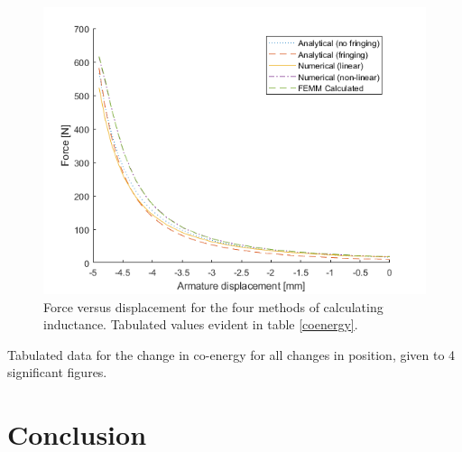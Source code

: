\documentclass[a4paper]{IEEEtran}
\begin{document}
    \begin{figure}[ht]
        \includegraphics[width = \linewidth]{F-x.png}
        \caption{Force versus displacement for the four methods of calculating inductance. Tabulated values evident in table \ref{coenergy}.}
        \label{forceGraph} 
    \end{figure}

    \begin{table}[ht]
        \centering
        
        \caption{Tabulated data for the change in co-energy for all changes in position, given to 4 significant figures.}
        \label{coenergy}
    \end{table}


\section{Conclusion}

\printbibliography

% 

% 
 
% 
\end{document}
